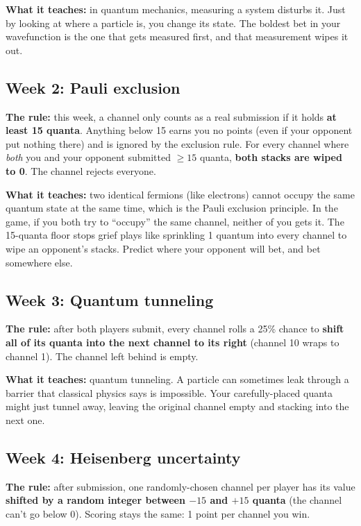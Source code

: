 \documentclass[11pt]{article}
\begin{document}
\textbf{What it teaches:} in quantum mechanics, measuring a system disturbs
it. Just by looking at where a particle is, you change its state. The boldest
bet in your wavefunction is the one that gets measured first, and that
measurement wipes it out.

\subsection*{Week 2: Pauli exclusion}
\textbf{The rule:} this week, a channel only counts as a real submission
if it holds \textbf{at least 15 quanta}. Anything below 15 earns you no
points (even if your opponent put nothing there) and is ignored by the
exclusion rule. For every channel where \emph{both} you and your opponent
submitted $\geq 15$ quanta, \textbf{both stacks are wiped to 0}. The
channel rejects everyone.

\textbf{What it teaches:} two identical fermions (like electrons) cannot
occupy the same quantum state at the same time, which is the Pauli exclusion
principle. In the game, if you both try to ``occupy'' the same channel,
neither of you gets it. The 15-quanta floor stops grief plays like
sprinkling 1 quantum into every channel to wipe an opponent's stacks.
Predict where your opponent will bet, and bet somewhere else.

\subsection*{Week 3: Quantum tunneling}
\textbf{The rule:} after both players submit, every channel rolls a 25\%
chance to \textbf{shift all of its quanta into the next channel to its
right} (channel 10 wraps to channel 1). The channel left behind is empty.

\textbf{What it teaches:} quantum tunneling. A particle can sometimes leak
through a barrier that classical physics says is impossible. Your
carefully-placed quanta might just tunnel away, leaving the original channel
empty and stacking into the next one.

\subsection*{Week 4: Heisenberg uncertainty}
\textbf{The rule:} after submission, one randomly-chosen channel per player
has its value \textbf{shifted by a random integer between $-15$ and $+15$
quanta} (the channel can't go below 0). Scoring stays the same: 1 point per
channel you win.
\end{document}
